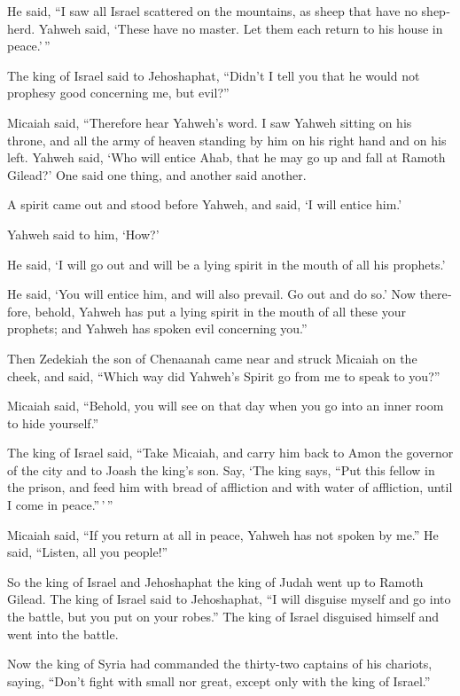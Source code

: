 \begin{paracol}{2}
\begin{otherlanguage}{english}
 He said, ``I saw all Israel scattered on the mountains,
as sheep that have no shepherd. Yahweh said, `These have no master. Let
them each return to his house in peace.'\,''

 The king of Israel said to Jehoshaphat, ``Didn't I tell
you that he would not prophesy good concerning me, but evil?''

 Micaiah said, ``Therefore hear Yahweh's word. I saw
Yahweh sitting on his throne, and all the army of heaven standing by him
on his right hand and on his left.  Yahweh said, `Who
will entice Ahab, that he may go up and fall at Ramoth Gilead?' One said
one thing, and another said another.

 A spirit came out and stood before Yahweh, and said, `I
will entice him.'

 Yahweh said to him, `How?'

He said, `I will go out and will be a lying spirit in the mouth of all
his prophets.'

He said, `You will entice him, and will also prevail. Go out and do so.'
 Now therefore, behold, Yahweh has put a lying spirit in
the mouth of all these your prophets; and Yahweh has spoken evil
concerning you.''

 Then Zedekiah the son of Chenaanah came near and struck
Micaiah on the cheek, and said, ``Which way did Yahweh's Spirit go from
me to speak to you?''

 Micaiah said, ``Behold, you will see on that day when
you go into an inner room to hide yourself.''

 The king of Israel said, ``Take Micaiah, and carry him
back to Amon the governor of the city and to Joash the king's son.
 Say, `The king says, ``Put this fellow in the prison,
and feed him with bread of affliction and with water of affliction,
until I come in peace.''\,'\,''

 Micaiah said, ``If you return at all in peace, Yahweh
has not spoken by me.'' He said, ``Listen, all you people!''

 So the king of Israel and Jehoshaphat the king of Judah
went up to Ramoth Gilead.  The king of Israel said to
Jehoshaphat, ``I will disguise myself and go into the battle, but you
put on your robes.'' The king of Israel disguised himself and went into
the battle.

 Now the king of Syria had commanded the thirty-two
captains of his chariots, saying, ``Don't fight with small nor great,
except only with the king of Israel.''


\end{otherlanguage}
\end{paracol}
